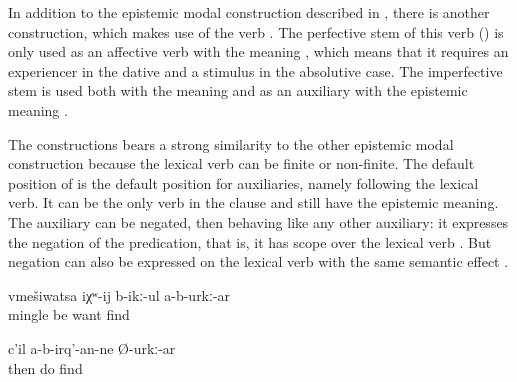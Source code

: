 In addition to the epistemic modal construction described in , there is another construction, which makes use of the verb  . The perfective stem of this verb () is only used as an affective verb with the meaning , which means that it requires an experiencer in the dative and a stimulus in the absolutive case. The imperfective stem  is used both with the meaning  and as an auxiliary with the epistemic meaning .

The  constructions bears a strong similarity to the other epistemic modal construction because the lexical verb can be finite or non-finite. The default position of  is the default position for auxiliaries, namely following the lexical verb. It can be the only verb in the clause and still have the epistemic meaning. The auxiliary can be negated, then behaving like any other auxiliary: it expresses the negation of the predication, that is, it has scope over the lexical verb . But negation can also be expressed on the lexical verb with the same semantic effect .
%
\begin{exe}
	\ex	\label{ex:(He) probably does not want to get involved}
	\gll	vmešiwatsa	iχʷ-ij	b-ikː-ul	a-b-urkː-ar\\
		mingle	be	want	find\\
	\glt	{}

	\ex	\label{ex:‎Then he will probably not do (this again)}
	\gll	c'il	a-b-irq'-an-ne	Ø-urkː-ar\\
		then	do	find\\
	\glt	{}
\end{exe}

